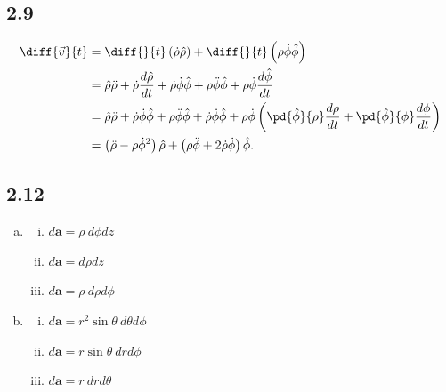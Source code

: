 \documentclass[10pt]{mypackage}
\begin{document}
\subsection{2.9}%
\begin{align*}
  \diff{\vec{v}}{t} &= \diff{}{t}\left(\dot{\rho}\hat\rho\right) + \diff{}{t}\left(\rho\dot\phi\hat\phi\right)\\
                    &= \hat{\rho}\ddot{\rho} + \dot\rho\frac{d\hat\rho}{dt} + \dot\rho\dot\phi\hat{\phi} + \rho\ddot\phi\hat\phi + \rho\dot\phi\frac{d\hat{\phi}}{dt}\\
                    &= \hat\rho\ddot\rho + \dot\rho\dot{\phi}\hat\phi + \rho\ddot\phi\hat\phi + \dot\rho\dot\phi\hat\phi + \rho\dot\phi\left(\pd{\hat\phi}{\rho}\frac{d\rho}{dt} + \pd{\hat\phi}{\phi}\frac{d\phi}{dt}\right)\\
                    &= \left(\ddot\rho - \rho\dot\phi^2\right) \hat{\rho} + \left(\rho\ddot\phi + 2\dot\rho\dot\phi\right)\hat{\phi}.
\end{align*}
\subsection{2.12}%
\begin{enumerate}[(a)]
  \item \hfill
    \begin{enumerate}[(i)]
      \item $d\mathbf{a} = \rho\:d\phi dz$
      \item $d\mathbf{a} = d\rho dz$
      \item $d \mathbf{a} = \rho\:d\rho d\phi$
    \end{enumerate}
  \item \hfill
    \begin{enumerate}[(i)]
      \item $d\mathbf{a} = r^2\sin \theta\:d\theta d\phi$
      \item $d\mathbf{a} = r \sin \theta\:dr d\phi$
      \item $d\mathbf{a} = r\:drd\theta$
    \end{enumerate}
\end{enumerate}
\end{document}
